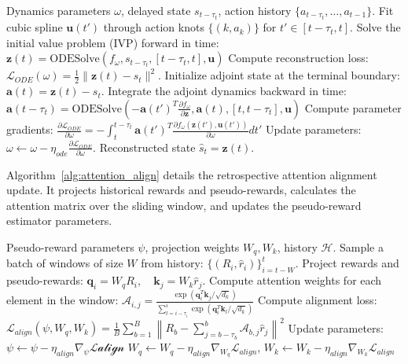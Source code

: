 \documentclass[manuscript, screen, review]{jair}
\begin{document}
\begin{algorithm}[h]
\caption{Predictive Layer Trajectory Integration and Adjoint Sensitivity}
\label{alg:ode_adjoint}
\begin{algorithmic}[1]
\REQUIRE Dynamics parameters $\omega$, delayed state $s_{t-\tau_t}$, action history $\{a_{t-\tau_t}, \dots, a_{t-1}\}$.
\STATE Fit cubic spline $\mathbf{u}(t')$ through action knots $\{(k, a_k)\}$ for $t' \in [t-\tau_t, t]$.
\STATE Solve the initial value problem (IVP) forward in time:
\STATE \quad $\mathbf{z}(t) = \text{ODESolve}(f_\omega, s_{t-\tau_t}, [t-\tau_t, t], \mathbf{u})$
\STATE Compute reconstruction loss: $\mathcal{L}_{ODE}(\omega) = \frac{1}{2} \| \mathbf{z}(t) - s_t \|^2$.
\STATE Initialize adjoint state at the terminal boundary: $\mathbf{a}(t) = \mathbf{z}(t) - s_t$.
\STATE Integrate the adjoint dynamics backward in time:
\STATE \quad $\mathbf{a}(t-\tau_t) = \text{ODESolve}\left(- \mathbf{a}(t')^T \frac{\partial f_\omega}{\partial \mathbf{z}}, \mathbf{a}(t), [t, t-\tau_t], \mathbf{u}\right)$
\STATE Compute parameter gradients:
\STATE \quad $\frac{\partial \mathcal{L}_{ODE}}{\partial \omega} = - \int_{t}^{t-\tau_t} \mathbf{a}(t')^T \frac{\partial f_\omega(\mathbf{z}(t'), \mathbf{u}(t'))}{\partial \omega} dt'$
\STATE Update parameters: $\omega \leftarrow \omega - \eta_{ode} \frac{\partial \mathcal{L}_{ODE}}{\partial \omega}$.
\RETURN Reconstructed state $\hat{s}_t = \mathbf{z}(t)$.
\end{algorithmic}
\end{algorithm}

Algorithm~\ref{alg:attention_align} details the retrospective attention alignment update. It projects historical rewards and pseudo-rewards, calculates the attention matrix over the sliding window, and updates the pseudo-reward estimator parameters.

\begin{algorithm}[h]
\caption{Retrospective Layer Attention Alignment Update}
\label{alg:attention_align}
\begin{algorithmic}[1]
\REQUIRE Pseudo-reward parameters $\psi$, projection weights $W_q, W_k$, history $\mathcal{H}$.
\STATE Sample a batch of windows of size $W$ from history: $\{ (R_i, \hat{r}_i) \}_{i=t-W}^t$.
\STATE Project rewards and pseudo-rewards: $\mathbf{q}_i = W_q R_i, \quad \mathbf{k}_j = W_k \hat{r}_j$.
\STATE Compute attention weights for each element in the window:
\STATE \quad $\mathcal{A}_{i, j} = \frac{\exp\left( \mathbf{q}_i^T \mathbf{k}_j / \sqrt{d_k} \right)}{\sum_{l=i-\tau_i}^{i} \exp\left( \mathbf{q}_i^T \mathbf{k}_l / \sqrt{d_k} \right)}$
\STATE Compute alignment loss:
\STATE \quad $\mathcal{L}_{align}(\psi, W_q, W_k) = \frac{1}{B} \sum_{b=1}^B \left\| R_b - \sum_{j=b-\tau_b}^{b} \mathcal{A}_{b, j} \hat{r}_j \right\|^2$
\STATE Update parameters:
\STATE \quad $\psi \leftarrow \psi - \eta_{align} \nabla_\psi \mathcal{L{align}}$
\STATE \quad $W_q \leftarrow W_q - \eta_{align} \nabla_{W_q} \mathcal{L}_{align}$, \quad $W_k \leftarrow W_k - \eta_{align} \nabla_{W_k} \mathcal{L}_{align}$
\end{algorithmic}
\end{algorithm}
\end{document}
